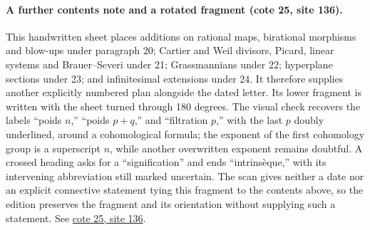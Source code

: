 \documentclass[10pt,a4paper]{article}
\begin{document}
\paragraph{A further contents note and a rotated fragment (cote 25, site 136).}
This handwritten sheet places additions on rational maps, birational morphisms and blow-ups under paragraph 20; Cartier and Weil divisors, Picard, linear systems and Brauer--Severi under 21; Grassmannians under 22; hyperplane sections under 23; and infinitesimal extensions under 24. It therefore supplies another explicitly numbered plan alongside the dated letter. Its lower fragment is written with the sheet turned through 180 degrees. The visual check recovers the labels ``poids $n$,'' ``poids $p+q$,'' and ``filtration $p$,'' with the last $p$ doubly underlined, around a cohomological formula; the exponent of the first cohomology group is a superscript $n$, while another overwritten exponent remains doubtful. A crossed heading asks for a ``signification'' and ends ``intrinsèque,'' with its intervening abbreviation still marked uncertain. The scan gives neither a date nor an explicit connective statement tying this fragment to the contents above, so the edition preserves the fragment and its orientation without supplying such a statement. See \href{https://grothendieck.umontpellier.fr/web/viewer.html?file=../25.pdf#page=137}{cote 25, site 136}.
\par{}

\par{}
\end{document}
